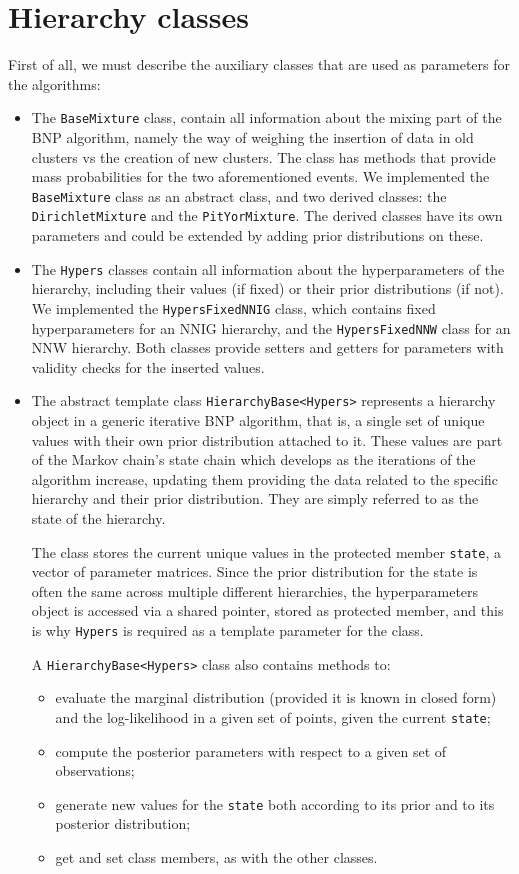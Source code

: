 \section{Hierarchy classes}
First of all, we must describe the auxiliary classes that are used as parameters for the algorithms:
\begin{itemize}
	\item The \verb|BaseMixture| class, contain all information about the mixing part of the BNP algorithm, namely the way of weighing the insertion of data in old clusters vs the creation of new clusters. The class has methods that provide mass probabilities for the two aforementioned events. We implemented the \verb|BaseMixture| class as an abstract class, and two derived classes: the \verb|DirichletMixture| and the \verb|PitYorMixture|. The derived classes have its own parameters and could be extended by adding prior distributions on these.

	\item The \verb|Hypers| classes contain all information about the hyperparameters of the hierarchy, including their values (if fixed) or their prior distributions (if not). We implemented the \verb|HypersFixedNNIG| class, which contains fixed hyperparameters for an NNIG hierarchy, and the \verb|HypersFixedNNW| class for an NNW hierarchy. Both classes provide setters and getters for parameters with validity checks for the inserted values.
	
	\item The abstract template class \verb|HierarchyBase<Hypers>| represents a hierarchy object in a generic iterative BNP algorithm, that is, a single set of unique values with their own prior
distribution attached to it. These values are part of the Markov chain's
state chain which develops as the iterations of the algorithm increase, updating them providing the data related to the specific hierarchy and their prior distribution.
They are simply referred to as the state of the hierarchy. 

The class stores the current unique values in the protected member \verb|state|, a vector of parameter matrices.
Since the prior distribution for the state is often the same across multiple
different hierarchies, the hyperparameters object is accessed via a shared
pointer, stored as protected member, and this is why \verb|Hypers| is required as a template parameter for the class. 

	A \verb|HierarchyBase<Hypers>| class also contains methods to:
	\begin{itemize}
		\item evaluate the marginal distribution (provided it is known in closed form) and the log-likelihood in a given set of points, given the current \verb|state|;
		\item compute the posterior parameters with respect to a given set of observations;
		\item generate new values for the \verb|state| both according to its prior and to its posterior distribution;
		\item get and set class members, as with the other classes.
	\end{itemize}



\end{itemize}
